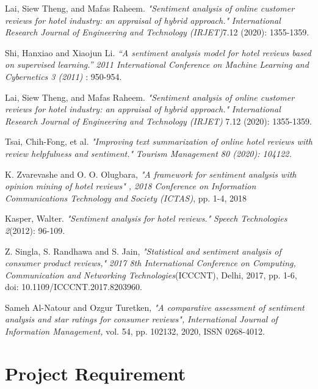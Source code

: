 \documentclass[a4paper, 12pt]{report}
\begin{document}
\begin{thebibliography}{9}
Lai, Siew Theng, and Mafas Raheem. 
\textit{"Sentiment analysis of online customer reviews for hotel industry: an appraisal of hybrid approach."}
\textit{International Research Journal of Engineering and Technology (IRJET)}7.12 (2020): 1355-1359.
\pagebreak

Shi, Hanxiao and Xiaojun Li.  
\textit{“A sentiment analysis model for hotel reviews based on supervised learning.”}
\textit{2011 International Conference on Machine Learning and Cybernetics 3 (2011)}
 : 950-954.

Lai, Siew Theng, and Mafas Raheem.  
\textit{"Sentiment analysis of online customer reviews for hotel industry: an appraisal of hybrid approach."}
\textit{International Research Journal of Engineering and Technology (IRJET)} 7.12 (2020): 1355-1359.

Tsai, Chih-Fong, et al.  
\textit{"Improving text summarization of online hotel reviews with review helpfulness and sentiment."}
\textit{Tourism Management 80 (2020): 104122.}

K. Zvarevashe and O. O. Olugbara,  
\textit{"A framework for sentiment analysis with opinion mining of hotel reviews"}
\textit{, 2018 Conference on Information Communications Technology and Society (ICTAS)}, pp. 1-4, 2018

Kasper, Walter.   
\textit{"Sentiment analysis for hotel reviews."}
\textit{Speech Technologies 2}(2012): 96-109.

Z. Singla, S. Randhawa and S. Jain,   
\textit{"Statistical and sentiment analysis of consumer product reviews,"}
\textit{2017 8th International Conference on Computing, Communication and Networking Technologies}(ICCCNT), Delhi, 2017, pp. 1-6, doi: 10.1109/ICCCNT.2017.8203960.

Sameh Al-Natour and Ozgur Turetken,   
\textit{"A comparative assessment of sentiment analysis and star 
	ratings for consumer reviews",}
\textit{International Journal of Information Management,} vol. 54, pp. 102132, 
2020, ISSN 0268-4012. 
 
   
\end{thebibliography}

\appendix 
{}
\chapter{Project Requirement}
\end{document}
